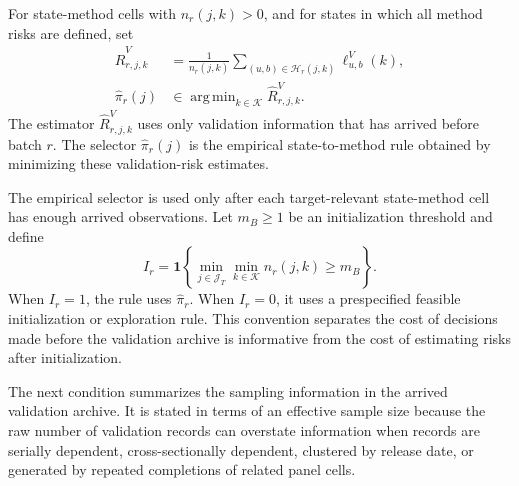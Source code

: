 \documentclass[a4paper, 12pt]{article}
\theoremstyle{plain}
\theoremstyle{remark}
\DeclareMathOperator*{\argmin}{arg\,min}
\newcommand{\Kcal}{\mathcal{K}}
\newcommand{\1}{\mathbf{1}}
\begin{document}
For state-method cells with \(n_r(j,k)>0\), and for states in which all method risks are defined, set
\begin{equation}
\label{eq:empirical-risk-selector}
\begin{aligned}
    \widehat R^V_{r,j,k}
    &=
    \frac{1}{n_r(j,k)}
    \sum_{(u,b)\in\mathcal H_r(j,k)}
    \ell^V_{u,b}(k),
    \\
    \widehat\pi_r(j)
    &\in
    \argmin_{k\in\Kcal}\widehat R^V_{r,j,k}.
\end{aligned}
\end{equation}
The estimator \(\widehat R^V_{r,j,k}\) uses only validation information that has arrived before batch \(r\). The selector \(\widehat\pi_r(j)\) is the empirical state-to-method rule obtained by minimizing these validation-risk estimates.

The empirical selector is used only after each target-relevant state-method cell has enough arrived observations. Let \(m_B\geq1\) be an initialization threshold and define
\begin{equation*}
    I_r=
    \1\!\left\{
    \min_{j\in\mathcal J_T}\min_{k\in\Kcal} n_r(j,k)\geq m_B
    \right\} .
\end{equation*}
When \(I_r=1\), the rule uses \(\widehat\pi_r\). When \(I_r=0\), it uses a prespecified feasible initialization or exploration rule. This convention separates the cost of decisions made before the validation archive is informative from the cost of estimating risks after initialization.

The next condition summarizes the sampling information in the arrived validation archive. It is stated in terms of an effective sample size because the raw number of validation records can overstate information when records are serially dependent, cross-sectionally dependent, clustered by release date, or generated by repeated completions of related panel cells.
\end{document}
